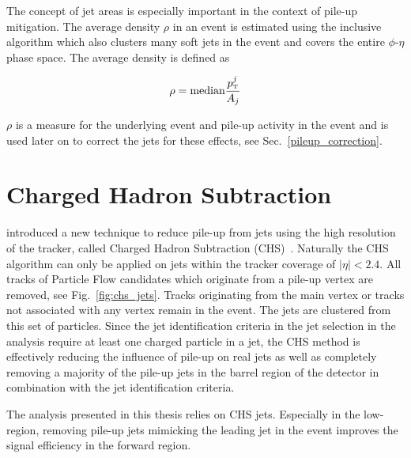 The concept of jet areas is especially important in the context of pile-up
mitigation. The average \pt density $\rho$ in an event is estimated using the inclusive
\kt algorithm which also clusters many soft jets in the event and covers the
entire $\phi$-$\eta$ phase space. The average \pt density is defined as

\begin{equation*}
    \rho = \text{median} \frac{\pt^j}{A_j}
\end{equation*}

$\rho$ is a measure for the underlying event and pile-up activity in the event
and is used later on to correct the jets for these effects, see
Sec.~\ref{pileup_correction}.

\section{Charged Hadron Subtraction}
\label{sec:chs_algorithm}


\CMS introduced a new technique to reduce pile-up from jets using the high
resolution of the tracker, called Charged Hadron Subtraction
(CHS)~\cite{Kirschenmann:2014dla}. Naturally the CHS algorithm can only be
applied on jets within the tracker coverage of $|\eta| < 2.4$. All tracks of
Particle Flow candidates which originate from a pile-up vertex are removed, see
Fig.~\ref{fig:chs_jets}. Tracks originating from the main vertex or tracks not
associated with any vertex remain in the event. The jets are clustered from this
set of particles.  Since the jet identification criteria in the jet selection in
the analysis require at least one charged particle in a jet, the CHS method is
effectively reducing the influence of pile-up on real jets as well as completely
removing a majority of the pile-up jets in the barrel region of the \CMS
detector in combination with the jet identification criteria.

The analysis presented in this thesis relies on CHS jets. Especially in the
low-\pt region, removing pile-up jets mimicking the leading jet in the event
improves the signal efficiency in the forward region.

